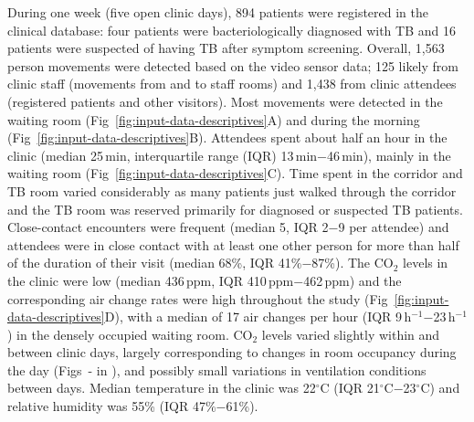 \documentclass[fleqn,11pt]{wlscirep}
\begin{document}
During one week (five open clinic days), 894 patients were registered in the clinical database: four patients were bacteriologically diagnosed with TB and 16 patients were suspected of having TB after symptom screening. Overall, 1,563 person movements were detected based on the video sensor data; 125 likely from clinic staff (movements from and to staff rooms) and 1,438 from clinic attendees (registered patients and other visitors). Most movements were detected in the waiting room (Fig~\ref{fig:input-data-descriptives}A) and during the morning (Fig~\ref{fig:input-data-descriptives}B). Attendees spent about half an hour in the clinic (median 25\,min, interquartile range (IQR) 13\,min$-$46\,min), mainly in the waiting room (Fig~\ref{fig:input-data-descriptives}C). Time spent in the corridor and TB room varied considerably as many patients just walked through the corridor and the TB room was reserved primarily for diagnosed or suspected TB patients. Close-contact encounters were frequent (median 5, IQR 2$-$9 per attendee) and attendees were in close contact with at least one other person for more than half of the duration of their visit (median 68\%, IQR 41\%$-$87\%). The CO$_2$ levels in the clinic were low (median 436\,ppm, IQR 410\,ppm$-$462\,ppm) and the corresponding air change rates were high throughout the study (Fig~\ref{fig:input-data-descriptives}D), with a median of 17 air changes per hour (IQR 9\,h$^{-1}$$-$23\,h$^{-1}$) in the densely occupied waiting room. CO$_2$ levels varied slightly within and between clinic days, largely corresponding to changes in room occupancy during the day (Figs~- in \supp), and possibly small variations in ventilation conditions between days. Median temperature in the clinic was 22$^{\circ}$C (IQR 21$^{\circ}$C$-$23$^{\circ}$C) and relative humidity was 55\% (IQR 47\%$-$61\%).
\end{document}

